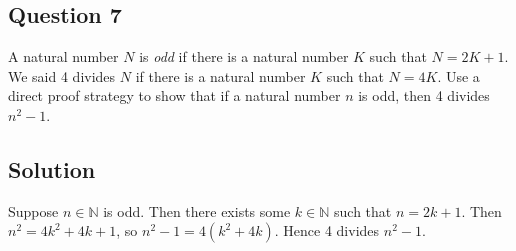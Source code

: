 \documentclass{article}
\begin{document}
\subsection*{Question 7}
    A natural number $N$ is \textit{odd} if there is a natural number $K$ such that $N = 2K + 1$. We said 4 divides $N$ if there is a natural number $K$ such that $N = 4K$. Use a direct proof strategy to show that if a natural number $n$ is odd, then 4 divides $n^2 - 1$.

\subsection*{Solution}
    Suppose $n \in \mathbb{N}$ is odd. Then there exists some $k \in \mathbb{N}$ such that $n = 2k + 1$. Then $n^2 = 4k^2 + 4k + 1$, so $n^2 - 1 = 4(k^2 + 4k)$. Hence 4 divides $n^2 - 1$.
\end{document}
